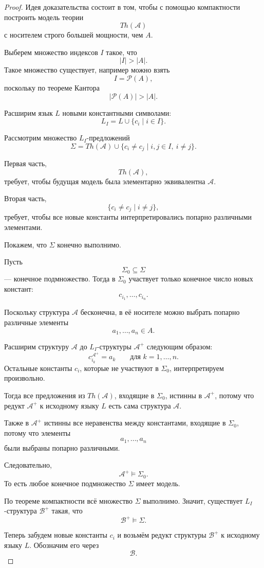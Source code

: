 \documentclass[12pt,a4paper,oneside,openany]{book}
\theoremstyle{definition}
\theoremstyle{plain}
\theoremstyle{remark}
\begin{document}
\begin{proof}
Идея доказательства состоит в том, чтобы с помощью компактности построить модель теории
\[
Th(\mathcal A)
\]
с носителем строго большей мощности, чем $A$.

Выберем множество индексов $I$ такое, что
\[
|I|>|A|.
\]
Такое множество существует, например можно взять
\[
I=\mathcal P(A),
\]
поскольку по теореме Кантора
\[
|\mathcal P(A)|>|A|.
\]

Расширим язык $L$ новыми константными символами:
\[
L_I=L\cup\{c_i\mid i\in I\}.
\]

Рассмотрим множество $L_I$-предложений
\[
\Sigma
=
Th(\mathcal A)
\cup
\{c_i\ne c_j\mid i,j\in I,\ i\ne j\}.
\]

Первая часть,
\[
Th(\mathcal A),
\]
требует, чтобы будущая модель была элементарно эквивалентна $\mathcal A$.

Вторая часть,
\[
\{c_i\ne c_j\mid i\ne j\},
\]
требует, чтобы все новые константы интерпретировались попарно различными элементами.

Покажем, что $\Sigma$ конечно выполнимо.

Пусть
\[
\Sigma_0\subseteq\Sigma
\]
— конечное подмножество. Тогда в $\Sigma_0$ участвует только конечное число новых констант:
\[
c_{i_1},\ldots,c_{i_n}.
\]

Поскольку структура $\mathcal A$ бесконечна, в её носителе можно выбрать попарно различные элементы
\[
a_1,\ldots,a_n\in A.
\]

Расширим структуру $\mathcal A$ до $L_I$-структуры $\mathcal A^+$ следующим образом:
\[
c_{i_k}^{\mathcal A^+}=a_k
\qquad
\text{для }k=1,\ldots,n.
\]
Остальные константы $c_i$, которые не участвуют в $\Sigma_0$, интерпретируем произвольно.

Тогда все предложения из $Th(\mathcal A)$, входящие в $\Sigma_0$, истинны в $\mathcal A^+$, потому что редукт $\mathcal A^+$ к исходному языку $L$ есть сама структура $\mathcal A$.

Также в $\mathcal A^+$ истинны все неравенства между константами, входящие в $\Sigma_0$, потому что элементы
\[
a_1,\ldots,a_n
\]
были выбраны попарно различными.

Следовательно,
\[
\mathcal A^+\models\Sigma_0.
\]
То есть любое конечное подмножество $\Sigma$ имеет модель.

По теореме компактности всё множество $\Sigma$ выполнимо. Значит, существует $L_I$-структура $\mathcal B^+$ такая, что
\[
\mathcal B^+\models\Sigma.
\]

Теперь забудем новые константы $c_i$ и возьмём редукт структуры $\mathcal B^+$ к исходному языку $L$. Обозначим его через
\[
\mathcal B.
\]


\end{proof}
\end{document}
